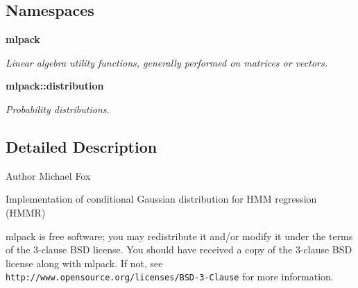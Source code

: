 \subsection*{Namespaces}
\begin{DoxyCompactItemize}
\item 
 {\bf mlpack}
\begin{DoxyCompactList}\small\item\em Linear algebra utility functions, generally performed on matrices or vectors. \end{DoxyCompactList}\item 
 {\bf mlpack\+::distribution}
\begin{DoxyCompactList}\small\item\em Probability distributions. \end{DoxyCompactList}\end{DoxyCompactItemize}


\subsection{Detailed Description}
\begin{DoxyAuthor}{Author}
Michael Fox
\end{DoxyAuthor}
Implementation of conditional Gaussian distribution for H\+MM regression (H\+M\+MR)

mlpack is free software; you may redistribute it and/or modify it under the terms of the 3-\/clause B\+SD license. You should have received a copy of the 3-\/clause B\+SD license along with mlpack. If not, see {\tt http\+://www.\+opensource.\+org/licenses/\+B\+S\+D-\/3-\/\+Clause} for more information. 